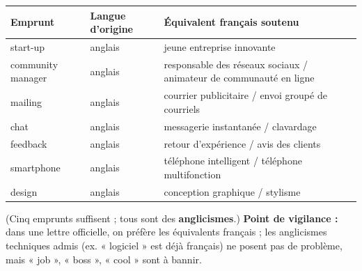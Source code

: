 \documentclass[11pt]{article}
\begin{document}
\begin{corrige}
\begin{center}
\begin{tabularx}{\linewidth}{|l|l|X|}
\hline
\rowcolor{popblueL} \textbf{Emprunt} & \textbf{Langue d'origine} & \textbf{Équivalent français soutenu} \\
\hline
start-up & anglais & jeune entreprise innovante \\
\hline
community manager & anglais & responsable des réseaux sociaux / animateur de communauté en ligne \\
\hline
mailing & anglais & courrier publicitaire / envoi groupé de courriels \\
\hline
chat & anglais & messagerie instantanée / clavardage \\
\hline
feedback & anglais & retour d'expérience / avis des clients \\
\hline
smartphone & anglais & téléphone intelligent / téléphone multifonction \\
\hline
design & anglais & conception graphique / stylisme \\
\hline
\end{tabularx}
\end{center}
(Cinq emprunts suffisent ; tous sont des \textbf{anglicismes}.) \textbf{Point de vigilance :} dans une lettre officielle, on préfère les équivalents français ; les anglicismes techniques admis (ex. « logiciel » est déjà français) ne posent pas de problème, mais « job », « boss », « cool » sont à bannir.
\end{corrige}
\end{document}
